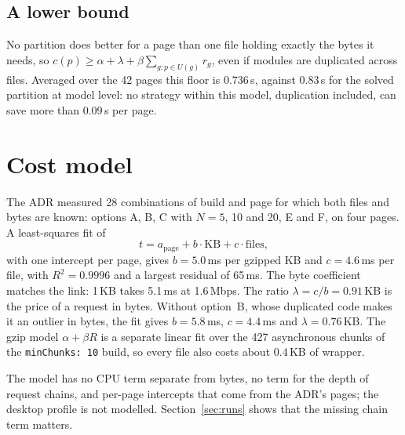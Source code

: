 \documentclass[11pt]{article}
\newcommand{\code}[1]{\texttt{#1}}
\begin{document}
\subsection{A lower bound}
No partition does better for a page than one file holding exactly the bytes it needs, so $c(p) \ge \alpha + \lambda + \beta \sum_{g : p \in U(g)} r_g$, even if modules are duplicated across files. Averaged over the 42 pages this floor is 0.736\,s, against 0.83\,s for the solved partition at model level: no strategy within this model, duplication included, can save more than 0.09\,s per page.

\section{Cost model}\label{sec:cost}
The ADR measured 28 combinations of build and page for which both files and bytes are known: options A, B, C with $N = 5$, 10 and 20, E and F, on four pages. A least-squares fit of
\[
t = a_{\text{page}} + b \cdot \mathrm{KB} + c \cdot \mathrm{files},
\]
with one intercept per page, gives $b = 5.0$\,ms per gzipped KB and $c = 4.6$\,ms per file, with $R^2 = 0.9996$ and a largest residual of 65\,ms. The byte coefficient matches the link: 1\,KB takes 5.1\,ms at 1.6\,Mbps. The ratio $\lambda = c / b = 0.91$\,KB is the price of a request in bytes. Without option~B, whose duplicated code makes it an outlier in bytes, the fit gives $b = 5.8$\,ms, $c = 4.4$\,ms and $\lambda = 0.76$\,KB. The gzip model $\alpha + \beta R$ is a separate linear fit over the 427 asynchronous chunks of the \code{minChunks: 10} build, so every file also costs about 0.4\,KB of wrapper.

The model has no CPU term separate from bytes, no term for the depth of request chains, and per-page intercepts that come from the ADR's pages; the desktop profile is not modelled. Section~\ref{sec:runs} shows that the missing chain term matters.
\end{document}
